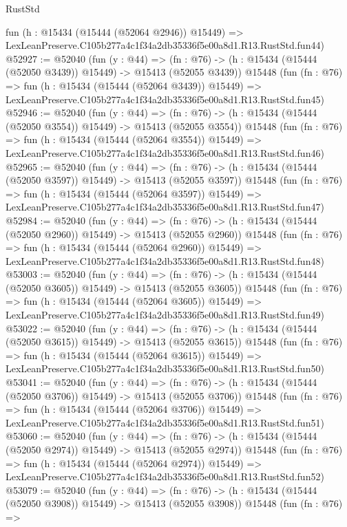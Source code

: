 \begin{lexlean}{RustStd}
\begin{coremodule}
    fun (h : @15434 (@15444 (@52064 @2946)) @15449) =>
    LexLeanPreserve.C105b277a4c1f34a2db35336f5e00a8d1.R13.RustStd.fun44)
@52927 := @52040
    (fun (y : @44) =>
    (fn : @76) -> (h : @15434 (@15444 (@52050 @3439)) @15449) -> @15413 (@52055 @3439))
    @15448
    (fun (fn : @76) =>
    fun (h : @15434 (@15444 (@52064 @3439)) @15449) =>
    LexLeanPreserve.C105b277a4c1f34a2db35336f5e00a8d1.R13.RustStd.fun45)
@52946 := @52040
    (fun (y : @44) =>
    (fn : @76) -> (h : @15434 (@15444 (@52050 @3554)) @15449) -> @15413 (@52055 @3554))
    @15448
    (fun (fn : @76) =>
    fun (h : @15434 (@15444 (@52064 @3554)) @15449) =>
    LexLeanPreserve.C105b277a4c1f34a2db35336f5e00a8d1.R13.RustStd.fun46)
@52965 := @52040
    (fun (y : @44) =>
    (fn : @76) -> (h : @15434 (@15444 (@52050 @3597)) @15449) -> @15413 (@52055 @3597))
    @15448
    (fun (fn : @76) =>
    fun (h : @15434 (@15444 (@52064 @3597)) @15449) =>
    LexLeanPreserve.C105b277a4c1f34a2db35336f5e00a8d1.R13.RustStd.fun47)
@52984 := @52040
    (fun (y : @44) =>
    (fn : @76) -> (h : @15434 (@15444 (@52050 @2960)) @15449) -> @15413 (@52055 @2960))
    @15448
    (fun (fn : @76) =>
    fun (h : @15434 (@15444 (@52064 @2960)) @15449) =>
    LexLeanPreserve.C105b277a4c1f34a2db35336f5e00a8d1.R13.RustStd.fun48)
@53003 := @52040
    (fun (y : @44) =>
    (fn : @76) -> (h : @15434 (@15444 (@52050 @3605)) @15449) -> @15413 (@52055 @3605))
    @15448
    (fun (fn : @76) =>
    fun (h : @15434 (@15444 (@52064 @3605)) @15449) =>
    LexLeanPreserve.C105b277a4c1f34a2db35336f5e00a8d1.R13.RustStd.fun49)
@53022 := @52040
    (fun (y : @44) =>
    (fn : @76) -> (h : @15434 (@15444 (@52050 @3615)) @15449) -> @15413 (@52055 @3615))
    @15448
    (fun (fn : @76) =>
    fun (h : @15434 (@15444 (@52064 @3615)) @15449) =>
    LexLeanPreserve.C105b277a4c1f34a2db35336f5e00a8d1.R13.RustStd.fun50)
@53041 := @52040
    (fun (y : @44) =>
    (fn : @76) -> (h : @15434 (@15444 (@52050 @3706)) @15449) -> @15413 (@52055 @3706))
    @15448
    (fun (fn : @76) =>
    fun (h : @15434 (@15444 (@52064 @3706)) @15449) =>
    LexLeanPreserve.C105b277a4c1f34a2db35336f5e00a8d1.R13.RustStd.fun51)
@53060 := @52040
    (fun (y : @44) =>
    (fn : @76) -> (h : @15434 (@15444 (@52050 @2974)) @15449) -> @15413 (@52055 @2974))
    @15448
    (fun (fn : @76) =>
    fun (h : @15434 (@15444 (@52064 @2974)) @15449) =>
    LexLeanPreserve.C105b277a4c1f34a2db35336f5e00a8d1.R13.RustStd.fun52)
@53079 := @52040
    (fun (y : @44) =>
    (fn : @76) -> (h : @15434 (@15444 (@52050 @3908)) @15449) -> @15413 (@52055 @3908))
    @15448
    (fun (fn : @76) =>

\end{coremodule}
\end{lexlean}
